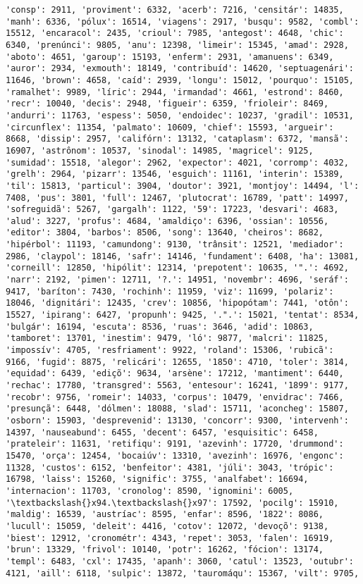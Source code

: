 \begin{Verbatim}[commandchars=\\\{\}]
'consp': 2911, 'proviment': 6332, 'acerb': 7216, 'censitár': 14835, 'manh': 6336, 'pólux': 16514, 'viagens': 2917, 'busqu': 9582, 'combl': 15512, 'encaracol': 2435, 'crioul': 7985, 'antegost': 4648, 'chic': 6340, 'prenúnci': 9805, 'anu': 12398, 'limeir': 15345, 'amad': 2928, 'aboto': 4651, 'garoup': 15193, 'enferm': 2931, 'amanuens': 6349, 'auror': 2934, 'exmouth': 18149, 'contribuíd': 14620, 'septuagenári': 11646, 'brown': 4658, 'caíd': 2939, 'longu': 15012, 'pourquo': 15105, 'ramalhet': 9989, 'líric': 2944, 'irmandad': 4661, 'estrond': 8460, 'recr': 10040, 'decis': 2948, 'figueir': 6359, 'frioleir': 8469, 'andurri': 11763, 'espess': 5050, 'endoidec': 10237, 'gradil': 10531, 'circunflex': 11354, 'palmato': 10609, 'chief': 15593, 'argueir': 8668, 'dissip': 2957, 'califórn': 13132, 'cataplasm': 6372, 'mansã': 16907, 'astrônom': 10537, 'sinodal': 14985, 'magricel': 9125, 'sumidad': 15518, 'alegor': 2962, 'expector': 4021, 'corromp': 4032, 'grelh': 2964, 'pizarr': 13546, 'esguich': 11161, 'interin': 15389, 'til': 15813, 'particul': 3904, 'doutor': 3921, 'montjoy': 14494, 'l': 7408, 'pus': 3801, 'full': 12467, 'plutocrat': 16789, 'patt': 14997, 'sofreguidã': 5267, 'gargalh': 1122, '59': 17223, 'desvari': 4683, 'alud': 3227, 'profus': 4684, 'amaldiço': 6396, 'ossian': 10556, 'editor': 3804, 'barbos': 8506, 'song': 13640, 'cheiros': 8682, 'hipérbol': 11193, 'camundong': 9130, 'trânsit': 12521, 'mediador': 2986, 'claypol': 18146, 'safr': 14146, 'fundament': 6408, 'ha': 13081, 'corneill': 12850, 'hipólit': 12314, 'prepotent': 10635, '".': 4692, 'narr': 2192, 'pimen': 12711, '?.': 14951, 'novembr': 4696, 'seráf': 9417, 'baríton': 7430, 'rochinh': 11959, 'viz': 11699, 'polariz': 18046, 'dignitári': 12435, 'crev': 10856, 'hipopótam': 7441, 'otôn': 15527, 'ipirang': 6427, 'propunh': 9425, '.".': 15021, 'tentat': 8534, 'bulgár': 16194, 'escuta': 8536, 'ruas': 3646, 'adid': 10863, 'tamboret': 13701, 'inestim': 9479, 'ló': 9877, 'malcri': 11825, 'impossív': 4705, 'resfriament': 9922, 'roland': 15306, 'rubicã': 9166, 'fugid': 8875, 'relicári': 12655, '1850': 4710, 'toler': 3814, 'equidad': 6439, 'ediçõ': 9634, 'arsène': 17212, 'mantiment': 6440, 'rechac': 17780, 'transgred': 5563, 'entesour': 16241, '1899': 9177, 'recobr': 9756, 'romeir': 14033, 'corpus': 10479, 'envidrac': 7466, 'presunçã': 6448, 'dólmen': 18088, 'slad': 15711, 'aconcheg': 15807, 'osborn': 15903, 'desprevenid': 13130, 'concorr': 9300, 'intervenh': 14397, 'nauseabund': 6455, 'decent': 6457, 'esquisitic': 6458, 'prateleir': 11631, 'retifiqu': 9191, 'azevinh': 17720, 'drummond': 15470, 'orça': 12454, 'bocaiúv': 13310, 'avezinh': 16976, 'engonc': 11328, 'custos': 6152, 'benfeitor': 4381, 'júli': 3043, 'trópic': 16798, 'laiss': 15260, 'signific': 3755, 'analfabet': 16694, 'internacion': 11703, 'cronolog': 8590, 'ignomini': 6005, '\textbackslash{}x94.\textbackslash{}x97': 17592, 'pocilg': 15910, 'maldig': 16539, 'austríac': 8595, 'enfar': 8596, '1822': 8086, 'lucull': 15059, 'deleit': 4416, 'cotov': 12072, 'devoçõ': 9138, 'biest': 12912, 'cronométr': 4343, 'repet': 3053, 'falen': 16919, 'brun': 13329, 'frivol': 10140, 'potr': 16262, 'fócion': 13174, 'templ': 6483, 'cxl': 17435, 'apanh': 3060, 'catul': 13523, 'outubr': 4121, 'aill': 6118, 'sulpic': 13872, 'tauromáqu': 15367, 'vilt': 9705, 
\end{Verbatim}
